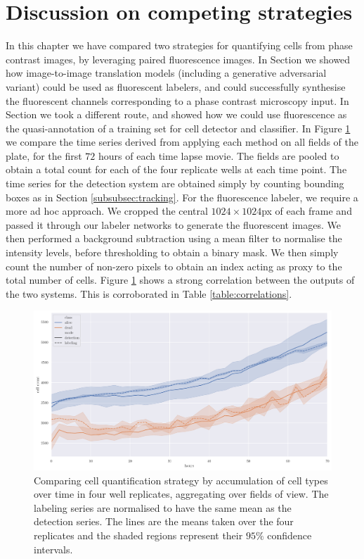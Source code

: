 \section{Discussion on competing strategies}
\label{sec:discussion_strategies}

\label{sec:object_detection_system}

In this chapter we have compared two strategies for quantifying cells from phase contrast images, by leveraging paired fluorescence images. In Section \label{sec:fluorescent_labeling} we showed how image-to-image translation models (including a generative adversarial variant) could be used as fluorescent labelers, and could successfully synthesise the fluorescent channels corresponding to a phase contrast microscopy input. In Section \label{sec:object_detection_system} we took a different route, and showed how we could use fluorescence as the quasi-annotation of a training set for cell detector and classifier. In Figure \ref{fig:cells_wells} we compare the time series derived from applying each method on all fields of the plate, for the first $72$ hours of each time lapse movie. The fields are pooled to obtain a total count for each of the four replicate wells at each time point. The time series for the detection system are obtained simply by counting bounding boxes as in Section \ref{subsubsec:tracking}. For the fluorescence labeler, we require a more ad hoc approach. We cropped the central $1024 \times 1024$px of each frame and passed it through our labeler networks to generate the fluorescent images. We then performed a background subtraction using a mean filter to normalise the intensity levels, before thresholding to obtain a binary mask. We then simply count the number of non-zero pixels to obtain an index acting as proxy to the total number of cells. Figure \ref{fig:cells_wells} shows a strong correlation between the outputs of the two systems. This is corroborated in Table \ref{table:correlations}.

\begin{figure}
\centering
\includegraphics[width=\textwidth]{img/wells.pdf}
\caption{Comparing cell quantification strategy by accumulation of cell types over time in four well replicates, aggregating over fields of view. The labeling series are normalised to have the same mean as the detection series. The lines are the means taken over the four replicates and the shaded regions represent their $95\%$ confidence intervals.}
\label{fig:cells_wells}
\end{figure}

